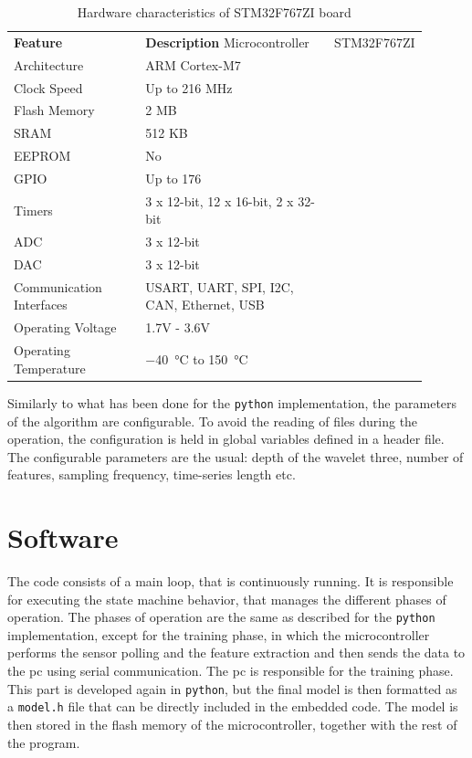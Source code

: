 \begin{longtable}{p{0.35\linewidth}p{0.55\linewidth}}
    \caption{Hardware characteristics of STM32F767ZI board}    \label{tab:stm32f767zi}\\
    \toprule
    \textbf{Feature} & \textbf{Description} \endfirsthead 
    \hline
    Microcontroller & STM32F767ZI \\
    Architecture & ARM Cortex-M7 \\
    Clock Speed & Up to 216 MHz \\
    Flash Memory & 2 MB \\
    SRAM & 512 KB \\
    EEPROM & No \\
    GPIO & Up to 176 \\
    Timers & 3 x 12-bit, 12 x 16-bit, 2 x 32-bit \\
    ADC & 3 x 12-bit \\
    DAC & 3 x 12-bit \\
    Communication Interfaces & USART, UART, SPI, I2C, CAN, Ethernet, USB \\
    Operating Voltage & 1.7V - 3.6V \\
    Operating Temperature & \SI{-40}{\celsius} to \SI{+150}{\celsius} \\
    \bottomrule    
\end{longtable}

Similarly to what has been done for the \texttt{python} implementation, the parameters of the algorithm are configurable. To avoid the reading of files during the operation, the configuration is held in global variables defined in a header file. The configurable parameters are the usual: depth of the wavelet three, number of features, sampling frequency, time-series length etc.

\section{Software}
The code consists of a main loop, that is continuously running. It is responsible for executing the state machine behavior, that manages the different phases of operation. The phases of operation are the same as described for the \texttt{python} implementation, except for the training phase, in which the microcontroller performs the sensor polling and the feature extraction and then sends the data to the \gls{pc} using serial communication. The \gls{pc} is responsible for the training phase. This part is developed again in \texttt{python}, but the final model is then formatted as a \texttt{model.h} file that can be directly included in the embedded code. The model is then stored in the flash memory of the microcontroller, together with the rest of the program.

